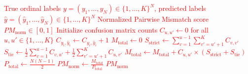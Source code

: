 \begin{algorithm}[H]
\caption{\textcolor{red}{Normalized Pairwise Mismatch ($PM_{\text{norm}}$) Computation}}
\label{alg:pm_computation}
\begin{algorithmic}[1]
\Require \textcolor{red}{True ordinal labels $y = (y_1, \dots, y_N) \in \{1, \dots, K\}^N$, predicted labels $\hat{y} = (\hat{y}_1, \dots, \hat{y}_N) \in \{1, \dots, K\}^N$}
\Ensure \textcolor{red}{Normalized Pairwise Mismatch score $PM_{\text{norm}} \in [0, 1]$}
\State \textcolor{red}{Initialize confusion matrix counts $C_{u,u'} \gets 0$ for all $u, u' \in \{1, \dots, K\}$ }
\For{\textcolor{red}{$i = 1$ to $N$}}
    \State \textcolor{red}{$C_{y_i, \hat{y}_i} \gets C_{y_i, \hat{y}_i} + 1$}
\EndFor
\State \textcolor{red}{$M_{\text{total}} \gets 0$ }
\For{\textcolor{red}{$u = 1$ to $K$}}
    \For{\textcolor{red}{$u' = 1$ to $K$}}
            \State \textcolor{red}{$S_{\text{strict}} \gets \sum_{v=1}^{u-1} \sum_{v'=u'+1}^{K} C_{v,v'}$ }
            \State \textcolor{red}{$S_{\text{tie}} \gets \frac{1}{2}\sum_{v=1}^{u-1} C_{v,u'} + \frac{1}{2}\sum_{v'=u'+1}^{K} C_{u,v'}$ }
            \State \textcolor{red}{$M_{\text{total}} \gets M_{\text{total}} + C_{u,u'} \times (S_{\text{strict}} + S_{\text{tie}})$}
        \EndIf
    \EndFor
\EndFor
\State \textcolor{red}{$P_{\text{total}} \gets \frac{N(N - 1)}{2}$ }
\State \textcolor{red}{$PM_{\text{norm}} \gets \frac{M_{\text{total}}}{P_{\text{total}}}$}
\State \Return \textcolor{red}{$PM_{\text{norm}}$}
\end{algorithmic}
\end{algorithm}
